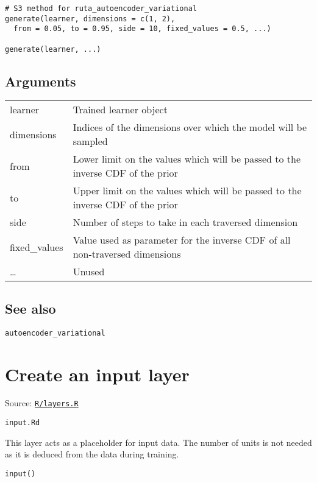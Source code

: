 \begin{verbatim}
# S3 method for ruta_autoencoder_variational
generate(learner, dimensions = c(1, 2),
  from = 0.05, to = 0.95, side = 10, fixed_values = 0.5, ...)

generate(learner, ...)
\end{verbatim}

\hypertarget{arguments}{\subsection{\texorpdfstring{\protect\hyperlink{arguments}{}Arguments}{Arguments}}\label{arguments}}

\begin{longtable}[c]{@{}ll@{}}
\toprule
learner & Trained learner object\tabularnewline
dimensions & Indices of the dimensions over which the model will be
sampled\tabularnewline
from & Lower limit on the values which will be passed to the inverse CDF
of the prior\tabularnewline
to & Upper limit on the values which will be passed to the inverse CDF
of the prior\tabularnewline
side & Number of steps to take in each traversed
dimension\tabularnewline
fixed\_values & Value used as parameter for the inverse CDF of all
non-traversed dimensions\tabularnewline
\ldots{} & Unused\tabularnewline
\bottomrule
\end{longtable}

\hypertarget{see-also}{\subsection{\texorpdfstring{\protect\hyperlink{see-also}{}See
also}{See also}}\label{see-also}}

\texttt{autoencoder\_variational}

\section{Create an input layer}\label{create-an-input-layer}

Source:
\href{https://github.com/fdavidcl/ruta/blob/master/R/layers.R}{\texttt{R/layers.R}}

\texttt{input.Rd}

This layer acts as a placeholder for input data. The number of units is
not needed as it is deduced from the data during training.

\begin{verbatim}
input()
\end{verbatim}

